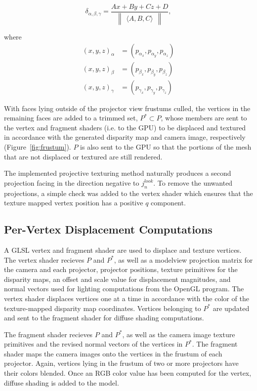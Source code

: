 \documentclass[a4paper,twoside]{article}
\begin{document}
\begin{equation}
\delta_{\alpha, \beta, \gamma} = \frac{Ax + By + Cz + D}{\begin{Vmatrix} \langle A, B, C \rangle \end{Vmatrix}},
\end{equation}

where
\begin{align}
\nonumber
(x, y, z)_{\alpha} &= (p_{\alpha_{x}}, p_{\alpha_{y}}, p_{\alpha_{z}})\\
\nonumber
(x, y, z)_{\beta} &= (p_{\beta_{x}}, p_{\beta_{y}}, p_{\beta_{z}})\\
(x, y, z)_{\gamma} &= (p_{\gamma_{x}}, p_{\gamma_{y}}, p_{\gamma_{z}})
\end{align}


With faces lying outside of the projector view frustums culled, the vertices in the remaining faces are added to a trimmed set, $P^{*}\subset P$, whose members are sent to the vertex and fragment shaders (i.e. to the GPU) to be displaced and textured in accordance with the generated disparity map and camera image, respectively (Figure~\ref{fig:frustum}). $P$ is also sent to the GPU so that the portions of the mesh that are not displaced or textured are still rendered.

The implemented projective texturing method naturally produces a second projection facing in the direction negative to $j_{n}^{look}$. To remove the unwanted projections, a simple check was added to the vertex shader which ensures that the texture mapped vertex position has a positive $q$ component.

\subsection{Per-Vertex Displacement Computations}

A GLSL vertex and fragment shader are used to displace and texture vertices. The vertex shader recieves $P$ and $P^{*}$, as well as a modelview projection matrix for the camera and each projector, projector positions, texture primitives for the disparity maps, an offset and scale value for displacement magnitudes, and normal vectors used for lighting computations from the OpenGL program. The vertex shader displaces vertices one at a time in accordance with the color of the texture-mapped disparity map coordinates. Vertices belonging to $P^{*}$ are updated and sent to the fragment shader for diffuse shading computations.

The fragment shader recieves $P$ and $P^{*}$, as well as the camera image texture primitives and the revised normal vectors of the vertices in $P^{*}$. The fragment shader maps the camera images onto the vertices in the frustum of each projector. Again, vertices lying in the frustum of two or more projectors have their colors blended. Once an RGB color value has been computed for the vertex, diffuse shading is added to the model.
\end{document}
